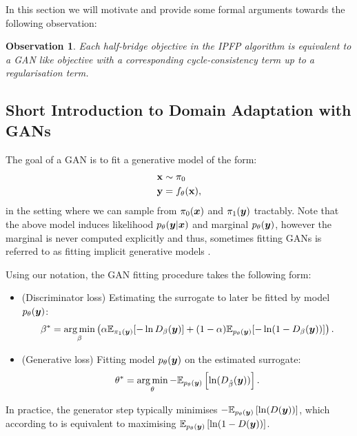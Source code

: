 \documentclass[a4paper,12pt,twoside,openright]{report}
\newtheorem{observation}{Observation}
\theoremstyle{definition}
\begin{document}
In this section we will motivate and provide some formal arguments towards the following observation:
\begin{observation}
Each half-bridge objective in the IPFP algorithm is equivalent to a GAN like objective with a corresponding cycle-consistency term up to a  regularisation term.
\end{observation}

\subsection{Short Introduction to Domain Adaptation with GANs}

The goal of a GAN \citep{goodfellow2014generative} is to fit a generative model of the form:
\begin{align*}
    {\mathbf{x}} &\sim \pi_0 \\
    {\mathbf{y}} &= f_{\theta}({\mathbf{x}}),
\end{align*}
in the setting where we can sample from $\pi_0({\bm{x}})$ and $\pi_1({\bm{y}})$ tractably. Note that the above model induces likelihood $p_{\theta}({\bm{y}} | {\bm{x}})$ and marginal $p_{\theta}({\bm{y}})$, however the marginal is never computed explicitly and thus, sometimes fitting GANs is referred to as fitting implicit generative models \citep{mohamed2016learning}.

Using our notation, the GAN fitting procedure \citep{goodfellow2014generative} takes the following form:

\begin{itemize}
    \item (Discriminator loss) Estimating the surrogate to later be fitted by model $p_{\theta}({\bm{y}})$:
 $$ {\beta}^{*} = \operatorname*{arg\,min}_{\beta} \left(\alpha \mathbb{E}_{\pi_1({\bm{y}})}[-\operatorname{ln} D_{\beta}({\bm{y}})] + (1-\alpha)\mathbb{E}_{p_{\theta}({\bm{y}})}[-\operatorname{ln} (1-D_{\beta}({\bm{y}}))]\right).$$ 
 \item (Generative loss) Fitting model $p_{\theta}({\bm{y}})$ on the estimated surrogate:
 $$\theta^{*} = \operatorname*{arg\,min}_{\theta}-\mathbb{E}_{p_{\theta}({\bm{y}})}\left[\operatorname{ln}(D_{\hat{\beta}}({\bm{y}}))\right].$$ 
\end{itemize}

In practice, the generator step \citep{goodfellow2014generative} typically minimises $-\mathbb{E}_{p_{\theta}({\bm{y}})}\left[\operatorname{ln}(D({\bm{y}}))\right]$, which according to \cite{goodfellow2014generative} is equivalent to maximising  $\mathbb{E}_{p_{\theta}({\bm{y}})}\left[\operatorname{ln}(1-D({\bm{y}}))\right]$.
\end{document}

